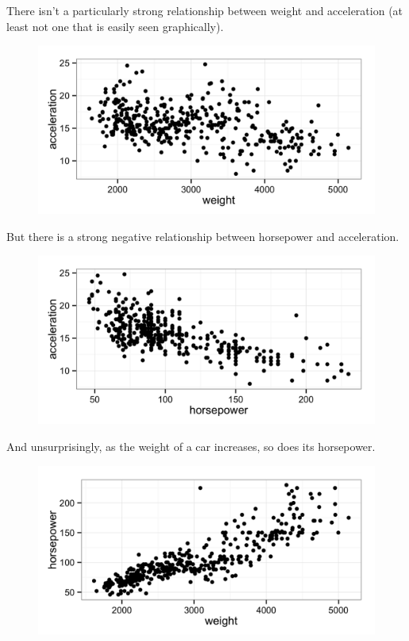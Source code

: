 \documentclass[11pt]{article}
\begin{document}
There isn't a particularly strong relationship between weight and acceleration (at least not one that is easily seen graphically).
\begin{figure}[H]
	\centering
	\includegraphics[width=5in]{9e_acc_vs_weight.png}
\end{figure}


But there is a strong negative relationship between horsepower and acceleration.
\begin{figure}[H]
	\centering
	\includegraphics[width=5in]{9e_acc_vs_hp.png}
\end{figure}

And unsurprisingly, as the weight of a car increases, so does its horsepower.
\begin{figure}[H]
	\centering
	\includegraphics[width=5in]{9e_hp_vs_weight.png}
\end{figure}
\end{document}
